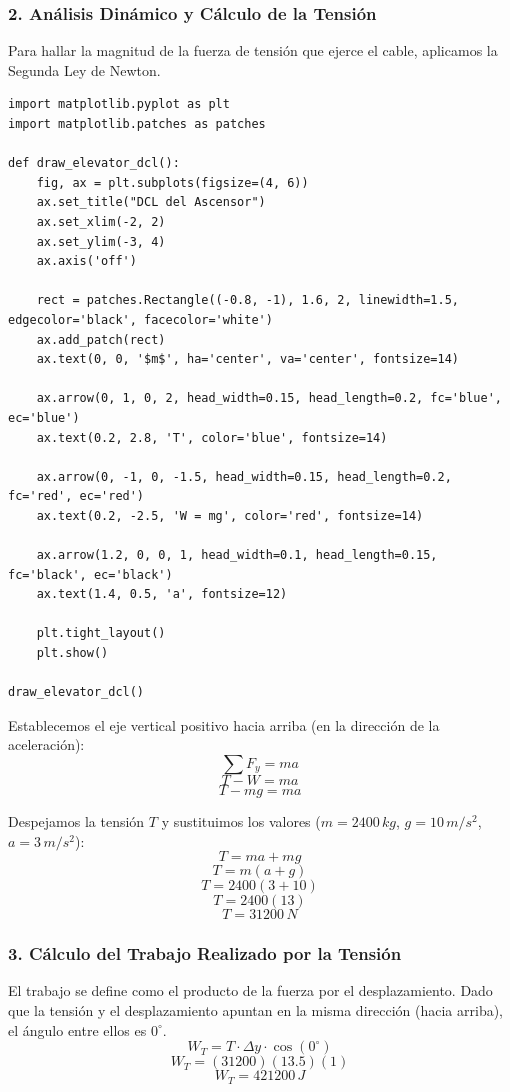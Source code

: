 \documentclass[12pt, a4paper]{article}
\begin{document}
\subsubsection*{2. Análisis Dinámico y Cálculo de la Tensión}
Para hallar la magnitud de la fuerza de tensión que ejerce el cable, aplicamos la Segunda Ley de Newton.

\begin{lstlisting}
import matplotlib.pyplot as plt
import matplotlib.patches as patches

def draw_elevator_dcl():
    fig, ax = plt.subplots(figsize=(4, 6))
    ax.set_title("DCL del Ascensor")
    ax.set_xlim(-2, 2)
    ax.set_ylim(-3, 4)
    ax.axis('off')
    
    rect = patches.Rectangle((-0.8, -1), 1.6, 2, linewidth=1.5, edgecolor='black', facecolor='white')
    ax.add_patch(rect)
    ax.text(0, 0, '$m$', ha='center', va='center', fontsize=14)
    
    ax.arrow(0, 1, 0, 2, head_width=0.15, head_length=0.2, fc='blue', ec='blue')
    ax.text(0.2, 2.8, 'T', color='blue', fontsize=14)
    
    ax.arrow(0, -1, 0, -1.5, head_width=0.15, head_length=0.2, fc='red', ec='red')
    ax.text(0.2, -2.5, 'W = mg', color='red', fontsize=14)
    
    ax.arrow(1.2, 0, 0, 1, head_width=0.1, head_length=0.15, fc='black', ec='black')
    ax.text(1.4, 0.5, 'a', fontsize=12)

    plt.tight_layout()
    plt.show()

draw_elevator_dcl()
\end{lstlisting}

Establecemos el eje vertical positivo hacia arriba (en la dirección de la aceleración):
$$ \sum F_y = m a $$
$$ T - W = m a $$
$$ T - mg = m a $$

Despejamos la tensión $T$ y sustituimos los valores ($m = 2400 \, \si{kg}$, $g = 10 \, \si{m/s^2}$, $a = 3 \, \si{m/s^2}$):
$$ T = m a + m g $$
$$ T = m(a + g) $$
$$ T = 2400(3 + 10) $$
$$ T = 2400(13) $$
$$ T = 31200 \, \si{N} $$

\subsubsection*{3. Cálculo del Trabajo Realizado por la Tensión}
El trabajo se define como el producto de la fuerza por el desplazamiento. Dado que la tensión y el desplazamiento apuntan en la misma dirección (hacia arriba), el ángulo entre ellos es $0^\circ$.
$$ W_T = T \cdot \Delta y \cdot \cos(0^\circ) $$
$$ W_T = (31200)(13.5)(1) $$
$$ W_T = 421200 \, \si{J} $$
\end{document}
